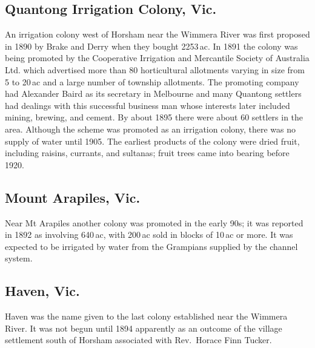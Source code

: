 \subsection*{Quantong Irrigation Colony, Vic.}

An irrigation colony west of Horsham near the Wimmera River was first
proposed in 1890 by Brake and Derry when they bought
2253\,ac.  In 1891
the colony was being promoted by the Cooperative Irrigation and
Mercantile Society of Australia Ltd. which advertised more than 80
horticultural allotments varying in size from 5 to 20\,ac and a large
number of township allotments.  The promoting company had Alexander
Baird as its secretary in Melbourne and many Quantong settlers had
dealings with this successful business man whose interests later
included mining, brewing, and cement.  By about 1895 there were about 60 settlers in the
area.  Although the scheme was promoted as an
irrigation colony, there was no supply of water until 1905.  The earliest
products of the colony were dried fruit, including raisins, currants,
and sultanas; fruit trees came into bearing before 1920.

\subsection*{Mount Arapiles, Vic.}

Near Mt Arapiles another colony was promoted in the early 90s; it was
reported in 1892 as involving 640\,ac, with 200\,ac sold in blocks of
10\,ac or more.
It was expected to be irrigated by water from the Grampians supplied
by the channel system.

\subsection*{Haven, Vic.}

Haven was the name given to the last colony established near the
Wimmera River.  It was not begun until 1894 apparently as an outcome
of the village settlement south of Horsham associated with Rev.~Horace
Finn Tucker.

